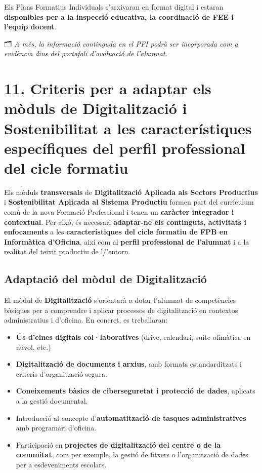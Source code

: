 \documentclass[
  paper=a4,
  ,captions=tableheading
]{scrartcl}
\providecommand{\tightlist}{%
  \setlength{\itemsep}{0pt}\setlength{\parskip}{0pt}}
\renewenvironment{quote}{\begin{customblockquote}\list{}{\rightmargin=0em\leftmargin=0em}%
\item\relax\color{blockquote-text}\ignorespaces}{\unskip\unskip\endlist\end{customblockquote}}
\begin{document}
Els Plans Formatius Individuals s'arxivaran en format digital i estaran
\textbf{disponibles per a la inspecció educativa, la coordinació de FEE
i l'equip docent}.

\begin{quote}
🗂 \emph{A més, la informació continguda en el PFI podrà ser incorporada
com a evidència dins del portafoli d'avaluació de l'alumnat.}
\end{quote}

\hypertarget{criteris-per-a-adaptar-els-muxf2duls-de-digitalitzaciuxf3-i-sostenibilitat-a-les-caracteruxedstiques-especuxedfiques-del-perfil-professional-del-cicle-formatiu}{%
\section{11. Criteris per a adaptar els mòduls de Digitalització i
Sostenibilitat a les característiques específiques del perfil
professional del cicle
formatiu}\label{criteris-per-a-adaptar-els-muxf2duls-de-digitalitzaciuxf3-i-sostenibilitat-a-les-caracteruxedstiques-especuxedfiques-del-perfil-professional-del-cicle-formatiu}}

Els mòduls \textbf{transversals} de \textbf{Digitalització Aplicada als
Sectors Productius} i \textbf{Sostenibilitat Aplicada al Sistema
Productiu} formen part del currículum comú de la nova Formació
Professional i tenen un \textbf{caràcter integrador i contextual}. Per
això, és necessari \textbf{adaptar-ne els continguts, activitats i
enfocaments} a les \textbf{característiques del cicle formatiu de FPB en
Informàtica d'Oficina}, així com al \textbf{perfil professional de
l'alumnat} i a la realitat del teixit productiu de l/'entorn.

\hypertarget{adaptaciuxf3-del-muxf2dul-de-digitalitzaciuxf3}{%
\subsection{Adaptació del mòdul de
Digitalització}\label{adaptaciuxf3-del-muxf2dul-de-digitalitzaciuxf3}}

El mòdul de \textbf{Digitalització} s'orientarà a dotar l'alumnat de
competències bàsiques per a comprendre i aplicar processos de
digitalització en contextos administratius i d'oficina. En concret, es
treballaran:

\begin{itemize}
\tightlist
\item
  \textbf{Ús d'eines digitals col·laboratives} (drive, calendari, suite
  ofimàtica en núvol, etc.)
\item
  \textbf{Digitalització de documents i arxius}, amb formats
  estandarditzats i criteris d'organització segura.
\item
  \textbf{Coneixements bàsics de ciberseguretat i protecció de dades},
  aplicats a la gestió documental.
\item
  Introducció al concepte d'\textbf{automatització de tasques
  administratives} amb programari d'oficina.
\item
  Participació en \textbf{projectes de digitalització del centre o de la
  comunitat}, com per exemple, la gestió de fitxers o l'organització de
  dades per a esdeveniments escolars.
\end{itemize}
\end{document}
